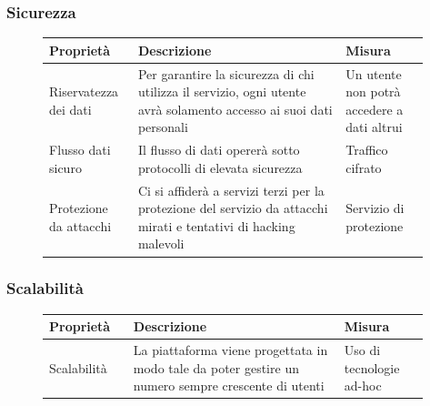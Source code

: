 \documentclass{article}
\begin{document}
\subsubsection{Sicurezza}\label{rnf_2}
\begin{description}
	\item[]
	    
	\begin{table}[!htbp]
		\begin{tabular} {|>{\raggedright\arraybackslash}m{0.20\linewidth} | >{\raggedright\arraybackslash}m{0.50\linewidth}|>{\raggedright\arraybackslash}m{0.20\linewidth}|}
			\hline
			\textbf{Proprietà} & \textbf{Descrizione}                                             & \textbf{Misura}  \\ \hline
			Riservatezza dei dati &
			Per garantire la sicurezza di chi utilizza il servizio, ogni utente avrà solamento accesso ai suoi dati personali &
			Un utente non potrà accedere a dati altrui \\ \hline
			Flusso dati sicuro  & Il flusso di dati opererà sotto protocolli di elevata sicurezza & Traffico cifrato \\ \hline
			Protezione da attacchi &
			Ci si affiderà a servizi terzi per la protezione del servizio da attacchi mirati e tentativi di hacking malevoli &
			Servizio di protezione \\ \hline
		\end{tabular}
	\end{table}
	    
\end{description}

\subsubsection{Scalabilità}\label{rnf_3}
\begin{description}
	\item[]
	    
	\begin{table}[!htbp]
		\begin{tabular} {|>{\raggedright\arraybackslash}m{0.20\linewidth} | >{\raggedright\arraybackslash}m{0.50\linewidth}|>{\raggedright\arraybackslash}m{0.20\linewidth}|}
			\hline
			\textbf{Proprietà} & \textbf{Descrizione}                                                                               & \textbf{Misura}          \\ \hline
			Scalabilità        & La piattaforma viene progettata in modo tale da poter gestire un numero sempre crescente di utenti & Uso di tecnologie ad-hoc \\ \hline
		\end{tabular}
	\end{table}
	    
\end{description}
\end{document}
